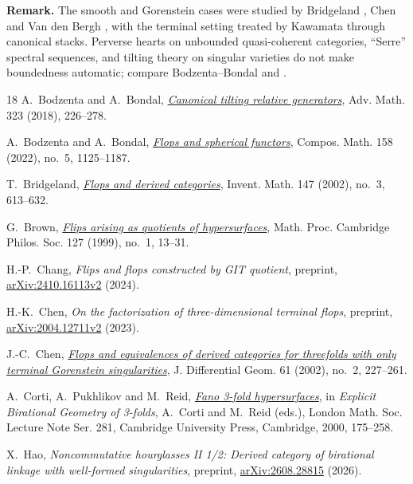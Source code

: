 \documentclass[a4paper,10pt]{article}
\theoremstyle{remark}
\theoremstyle{plain}
\begin{document}
\medskip
\noindent\textbf{Remark.}
The smooth and Gorenstein cases were studied by Bridgeland
\cite{Bridgeland}, Chen \cite{Chen} and Van den Bergh \cite{VdB},
with the terminal setting treated by Kawamata \cite{Kawamata} through
canonical stacks. Perverse hearts on unbounded quasi-coherent categories,
``Serre'' spectral sequences, and tilting theory on singular varieties
do not make boundedness automatic; compare Bodzenta--Bondal
\cite[Remark~2.3]{BBFlops} and \cite{BBTilting}.
\begin{thebibliography}{18}\small
{} A.~Bodzenta and A.~Bondal,
\href{https://doi.org/10.1016/j.aim.2017.10.016}{\emph{Canonical tilting relative generators}},
Adv. Math. 323 (2018), 226--278.

 A.~Bodzenta and A.~Bondal,
\href{https://doi.org/10.1112/S0010437X22007497}{\emph{Flops and spherical functors}},
Compos. Math. 158 (2022), no.~5, 1125--1187.

 T.~Bridgeland,
\href{https://doi.org/10.1007/s002220100185}{\emph{Flops and derived categories}},
Invent. Math. 147 (2002), no.~3, 613--632.

 G.~Brown,
\href{https://doi.org/10.1017/S0305004198003351}{\emph{Flips arising as quotients of hypersurfaces}},
Math. Proc. Cambridge Philos. Soc. 127 (1999), no.~1, 13--31.

 H.-P.~Chang,
\emph{Flips and flops constructed by GIT quotient},
preprint, \href{https://arxiv.org/abs/2410.16113v2}{arXiv:2410.16113v2} (2024).

 H.-K.~Chen,
\emph{On the factorization of three-dimensional terminal flops},
preprint, \href{https://arxiv.org/abs/2004.12711v2}{arXiv:2004.12711v2} (2023).

 J.-C.~Chen,
\href{https://doi.org/10.4310/jdg/1090351385}{\emph{Flops and equivalences of derived categories
for threefolds with only terminal Gorenstein singularities}},
J. Differential Geom. 61 (2002), no.~2, 227--261.

 A.~Corti, A.~Pukhlikov and M.~Reid,
\href{https://doi.org/10.1017/CBO9780511758942.006}{\emph{Fano 3-fold hypersurfaces}},
in \emph{Explicit Birational Geometry of 3-folds}, A.~Corti and M.~Reid (eds.),
London Math. Soc. Lecture Note Ser. 281, Cambridge University Press,
Cambridge, 2000, 175--258.

 X.~Hao,
\emph{Noncommutative hourglasses II 1/2: Derived category of birational
linkage with well-formed singularities},
preprint, \href{https://arxiv.org/abs/2608.28815}{arXiv:2608.28815} (2026).


\end{thebibliography}
\end{document}
